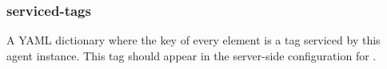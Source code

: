 \subsubsection{serviced-tags}\label{sec:agent-serviced-tags}
A YAML dictionary where the key of every element is a tag serviced by this agent instance.  This
tag should appear in the server-side configuration for .